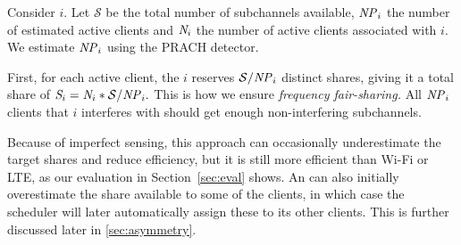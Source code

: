 

Consider \eNB $i$. Let $\mathcal{S}$ be the total number of subchannels available, 
$\id{NP}_i$ the number of estimated active clients and 
$\id{N}_i$ the number of active clients associated with \eNB $i$. 
We estimate $\id{NP}_i$ using the PRACH detector.


First, for each active client, the \eNB $i$ reserves 
$\mathcal{S} / \id{NP}_i$ 
distinct shares, giving it a total share of 
$\id{S}_i =  \id{N}_i * \mathcal{S} / \id{NP}_i.$ 
This is how we ensure \emph{frequency fair-sharing.} All $\id{NP}_i$ clients that \eNB $i$ interferes with should get enough non-interfering subchannels. 

Because of imperfect sensing, this approach can occasionally underestimate the target shares and reduce efficiency, but it is still more efficient than Wi-Fi or LTE, as our evaluation in Section~\ref{sec:eval} shows. An \eNB can also initially overestimate the share available to some of the clients, in which case the scheduler will later automatically assign these to its other clients. This is further discussed later in \ref{sec:asymmetry}.









